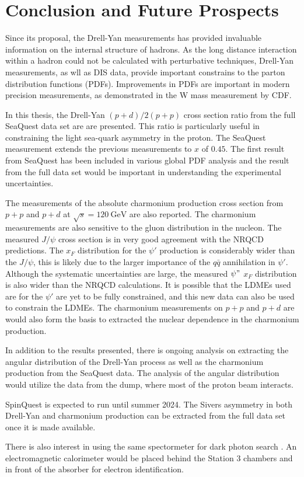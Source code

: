 \documentclass[../main.tex]{subfiles}
\begin{document}
\ifSubfilesClassLoaded{
	\mainmatter
	\setcounter{chapter}{5}
}{}

\chapter{Conclusion and Future Prospects}
\label{ch:conclusion}
Since its proposal, the Drell-Yan measurements has provided invaluable information
on the internal structure of hadrons. As the long distance interaction within a
hadron could not be calculated with perturbative techniques, Drell-Yan measurements,
as wll as DIS data, provide important constrains to the parton distribution functions
(PDFs). Improvements in PDFs are important in modern precision measurements, as
demonstrated in the W mass measurement by CDF.

In this thesis, the Drell-Yan $(p+d)/2(p+p)$ cross section ratio from the full
SeaQuest data set are are presented. This ratio is particularly useful in constraining 
the light sea-quark asymmetry in the proton.  The SeaQuest measurement extends the
previous measurements to $x$ of $0.45$. 
The first result from SeaQuest has been included in various global PDF analysis
and the result from the full data set would be important in understanding the
experimental uncertainties.

The measurements of the absolute charmonium production cross section from $p+p$
and $p+d$ at $\sqrt{s}=\SI{120}{\GeV}$ are also reported. The charmonium measurements
are also sensitive to the gluon distribution in the nucleon. The measured
$J/\psi$ cross section is in very good agreement with the NRQCD predictions.
The $x_F$ distribution for the $\psi'$ production is considerably wider than the
$J/\psi$, this is likely due to the larger importance of the $q\bar{q}$ annihilation
in $\psi'$. Although the systematic uncertainties are large, the measured $\psi"$ 
$x_F$ distribution is also wider than the NRQCD calculations. It is possible that
the LDMEs used are for the $\psi'$ are yet to be fully constrained, and this new
data can also be used to constrain the LDMEs.
The charmonium measurements on $p+p$ and $p+d$ are would also form the basis to 
extracted the nuclear dependence in the charmonium production.

In addition to the results presented, there is ongoing analysis on extracting 
the angular distribution of the Drell-Yan process as well as the charmonium 
production from the SeaQuest data. The analysis of the angular distribution would 
utilize the data from the dump, where most of the proton beam interacts.


SpinQuest is expected to run until summer 2024. The Sivers
asymmetry in both Drell-Yan and charmonium production can be extracted from the full
data set once it is made available.

There is also interest in using the same spectormeter for dark photon search
\cite{apyan2022}. An electromagnetic calorimeter would be placed behind the 
Station 3 chambers and in front of the absorber for electron identification.

\ifSubfilesClassLoaded{ \printbibliography[heading=bibintoc,title={References}]}{}
\end{document}
